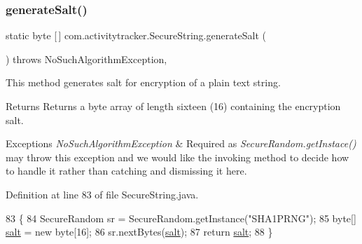 \subsubsection{\texorpdfstring{generate\+Salt()}{generateSalt()}}
{\footnotesize\ttfamily static byte \mbox{[}$\,$\mbox{]} com.\+activitytracker.\+Secure\+String.\+generate\+Salt (\begin{DoxyParamCaption}{ }\end{DoxyParamCaption}) throws No\+Such\+Algorithm\+Exception\hspace{0.3cm}{\ttfamily [static]}, {\ttfamily [private]}}

This method generates salt for encryption of a plain text string.

\begin{DoxyReturn}{Returns}
Returns a byte array of length sixteen (16) containing the encryption salt.
\end{DoxyReturn}

\begin{DoxyExceptions}{Exceptions}
{\em No\+Such\+Algorithm\+Exception} & Required as {\itshape Secure\+Random.\+get\+Instace()} may throw this exception and we would like the invoking method to decide how to handle it rather than catching and dismissing it here. \\
\hline
\end{DoxyExceptions}


Definition at line 83 of file Secure\+String.\+java.


\begin{DoxyCode}
83                                                                          \{
84         SecureRandom sr = SecureRandom.getInstance(\textcolor{stringliteral}{"SHA1PRNG"});
85         byte[] \mbox{\hyperlink{classcom_1_1activitytracker_1_1_secure_string_a8549ead1f186ff0c2520818b03d1cc21}{salt}} = \textcolor{keyword}{new} byte[16];
86         sr.nextBytes(\mbox{\hyperlink{classcom_1_1activitytracker_1_1_secure_string_a8549ead1f186ff0c2520818b03d1cc21}{salt}});
87         \textcolor{keywordflow}{return} \mbox{\hyperlink{classcom_1_1activitytracker_1_1_secure_string_a8549ead1f186ff0c2520818b03d1cc21}{salt}};
88     \}
\end{DoxyCode}
\mbox{\label{classcom_1_1activitytracker_1_1_secure_string_aa2521591ab15fb4c5a2461c04b08320f}} 
